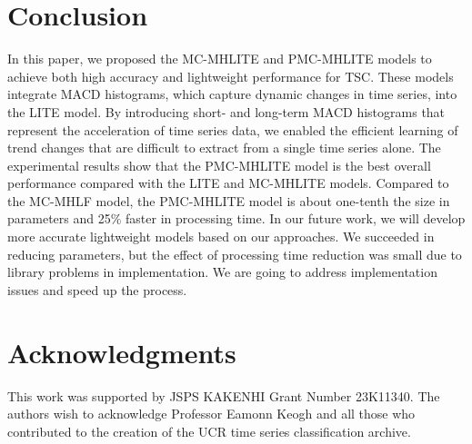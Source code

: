 \documentclass[conference]{IEEEtran}
\begin{document}
\section{Conclusion}
In this paper, we proposed the MC-MHLITE and PMC-MHLITE models to achieve both high accuracy and lightweight performance for TSC. These models integrate MACD histograms, which  capture dynamic changes in time series, into the LITE model. By introducing short- and long-term MACD histograms that represent the acceleration of time series data, we enabled the efficient learning of trend changes that are difficult to extract from a single time series alone. The experimental results show that the PMC-MHLITE model is the best overall performance compared with the LITE and MC-MHLITE models. Compared to the MC-MHLF model, the PMC-MHLITE model is about one-tenth the size in parameters and 25\% faster in processing time. In our future work, we will develop more accurate lightweight models based on our approaches. We succeeded in reducing parameters, but the effect of processing time reduction was small due to library problems in implementation. We are going to address implementation issues and speed up the process.



\section{Acknowledgments}
This work was supported by JSPS KAKENHI Grant Number 23K11340. The authors wish to acknowledge Professor Eamonn Keogh and all those who contributed to the creation of the UCR time series classification archive.
\end{document}
